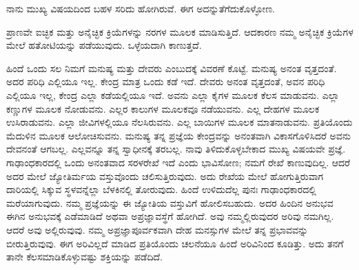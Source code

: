 ನಾನು ಮುಖ್ಯ ವಿಷಯದಿಂದ ಬಹಳ ಸರಿದು ಹೋಗಿರುವೆ. ಈಗ ಅದನ್ನು\break ತೆಗೆದುಕೊಳ್ಳೋಣ.

ಪ್ರಾಣವೇ ಐಚ್ಛಿಕ ಮತ್ತು ಅನೈಚ್ಛಿಕ ಕ್ರಿಯೆಗಳನ್ನು ನರಗಳ ಮೂಲಕ ಮಾಡಿಸುತ್ತಿದೆ. ಆದಕಾರಣ ನಮ್ಮ ಅನೈಚ್ಛಿಕ ಕ್ರಿಯೆಗಳ ಮೇಲೆ ಹತೋಟಿಯನ್ನು ಪಡೆಯುವುದು. ಒಳ್ಳೆಯದಾಗಿ ಕಾಣುತ್ತದೆ.

ಹಿಂದೆ ಒಂದು ಸಲ ನಿಮಗೆ ಮನುಷ್ಯ ಮತ್ತು ದೇವರು ಎಂಬುದಕ್ಕೆ ವಿವರಣೆ ಕೊಟ್ಟೆ. ಮನುಷ್ಯ ಅನಂತ ವೃತ್ತದಂತೆ. ಅದರ ಪರಿಧಿ ಎಲ್ಲಿಯೂ ಇಲ್ಲ. ಕೇಂದ್ರ ಮಾತ್ರ ಒಂದು ಕಡೆ ಇದೆ. ದೇವರು ಅನಂತ ವೃತ್ತದಂತೆ, ಅವನ ಪರಿಧಿ ಎಲ್ಲಿಯೂ ಇಲ್ಲ, ಕೇಂದ್ರ ಎಲ್ಲಾ ಕಡೆಯಲ್ಲಿಯೂ ಇದೆ. ಅವನು ಎಲ್ಲಾ ಕೈಗಳ ಮೂಲಕ ಕೆಲಸ ಮಾಡುವನು. ಎಲ್ಲಾ ಕಣ್ಣುಗಳ ಮೂಲಕ ನೋಡುವನು. ಎಲ್ಲರ ಕಾಲುಗಳ ಮೂಲಕವೂ ನಡೆಯುವನು. ಎಲ್ಲ ದೇಹಗಳ ಮೂಲಕ ಉಸಿರಾಡುವನು. ಎಲ್ಲಾ ಜೀವಿಗಳಲ್ಲಿಯೂ ನೆಲಸಿರುವನು. ಎಲ್ಲ ಬಾಯಿಗಳ ಮೂಲಕ ಮಾತನಾಡುವನು. ಪ್ರತಿಯೊಂದು ಮೆದುಳಿನ ಮೂಲಕ ಆಲೋಚಿಸುವನು. ಮನುಷ್ಯ ತನ್ನ ಪ್ರಜ್ಞೆಯ ಕೇಂದ್ರವನ್ನು ಅನಂತವಾಗಿ ವಿಕಾಸಗೊಳಿಸಿದರೆ ಅವನು ದೇವನಂತೆ ಆಗಬಲ್ಲ. ಎಲ್ಲವನ್ನೂ ತನ್ನ ಸ್ವಾಧೀನಕ್ಕೆ ತರಬಲ್ಲ. ನಾವು ತಿಳಿದುಕೊಳ್ಳಬೇಕಾದ ಮುಖ್ಯ ವಿಷಯವೇ ಪ್ರಜ್ಞೆ. ಗಾಢಾಂಧಕಾರದಲ್ಲಿ ಒಂದು ಅನಂತವಾದ ಸರಳರೇಖೆ ಇದೆ ಎಂದು ಭಾವಿಸೋಣ; ನಮಗೆ ರೇಖೆ ಕಾಣುವುದಿಲ್ಲ. ಆದರೆ ಅದರ ಮೇಲೆ ಜ್ಯೋತಿರ್ಮಯ ವಸ್ತುವೊಂದು ಚಲಿಸುತ್ತಿರುವುದು. ಅದು ರೇಖೆಯ ಮೇಲೆ ಹೋಗುತ್ತಿರುವಾಗ ದಾರಿಯಲ್ಲಿ ಸಿಕ್ಕುವ ಸ್ಥಳವನ್ನೆಲ್ಲಾ ಬೆಳಕಿನಲ್ಲಿ ತೋರುವುದು. ಹಿಂದೆ ಉಳಿದುದೆಲ್ಲ ಪುನಃ ಗಾಢಾಂಧಕಾರದಲ್ಲಿ ಮರೆಯಾಗುವುದು. ನಮ್ಮ ಪ್ರಜ್ಞೆಯನ್ನು ಈ ಜ್ಯೋತಿಯ ವಸ್ತುವಿಗೆ ಹೋಲಿಸಬಹುದು. ಅದರ ಹಿಂದಿನ ಅನುಭವ ಈಗಿನ ಅನುಭವಕ್ಕೆ ಎಡೆಮಾಡಿದೆ ಅಥವಾ ಅಪ್ರಜ್ಞಾವಸ್ಥೆಗೆ ಹೋಗಿದೆ. ಅವು ನಮ್ಮಲ್ಲಿರುವುದರ ಅರಿವು ನಮಗಿಲ್ಲ. ಆದರೆ ಅವು ಅಲ್ಲಿರುವುವು. ನಮ್ಮ ಅಪ್ರಜ್ಞಾಪೂರ್ವಕವಾಗಿ ದೇಹ ಮನಸ್ಸುಗಳ ಮೇಲೆ ತನ್ನ ಪ್ರಭಾವವನ್ನು ಬೀರುತ್ತಿರುವುವು. ಈಗ ಅರಿವಿಲ್ಲದೆ ಮಾಡಿದ ಪ್ರತಿಯೊಂದು ಚಲನೆಯೂ ಹಿಂದೆ ಅರಿವಿನಿಂದ ಕೂಡಿತ್ತು. ಅದು ತನಗೆ ತಾನೇ ಕೆಲಸಮಾಡಿಕೊಳ್ಳುವಷ್ಟು ಶಕ್ತಿಯನ್ನು ಪಡೆದಿದೆ.

